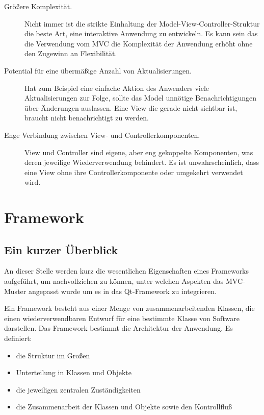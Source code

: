 \documentclass[11pt,a4paper,titlepage]{scrreprt}
\begin{document}
\begin{description}
\item[Größere Komplexität.]
Nicht immer ist die strikte Einhaltung der Model-View-Controller-Struktur die beste Art, eine
interaktive Anwendung zu entwickeln. Es kann sein das die Verwendung vom MVC die Komplexität
der Anwendung erhöht ohne den Zugewinn an Flexibilität.


\item[Potential für eine übermäßige Anzahl von Aktualisierungen.] Hat zum Beispiel eine
einfache Aktion des Anwenders viele Aktualisierungen zur Folge, sollte das Model unnötige
Benachrichtigungen über Änderungen auslassen. Eine View die gerade nicht sichtbar ist, braucht
nicht benachrichtigt zu werden.

\item[Enge Verbindung zwischen View- und Controllerkomponenten.] View und Controller sind
eigene, aber eng gekoppelte Komponenten, was deren jeweilige Wiederverwendung behindert.
Es ist unwahrscheinlich, dass eine View ohne ihre Controllerkomponente oder umgekehrt
verwendet wird.
\end{description}

\chapter{Framework}
\section{Ein kurzer Überblick}
An dieser Stelle werden kurz die wesentlichen Eigenschaften eines Frameworks aufgeführt,
um nachvollziehen zu können, unter welchen Aspekten das MVC-Muster angepasst wurde um es
in das Qt-Framework zu integrieren.{\medskip}

Ein Framework besteht aus einer Menge von zusammenarbeitenden Klassen, die einen
wiederverwendbaren Entwurf für eine bestimmte Klasse von Software darstellen. Das
Framework bestimmt die Architektur der Anwendung. Es definiert:

\begin{itemize}
\item die Struktur im Großen
\item Unterteilung in Klassen und Objekte
\item die jeweiligen zentralen Zuständigkeiten
\item die Zusammenarbeit der Klassen und Objekte sowie den Kontrollfluß
\end{itemize}
\end{document}
